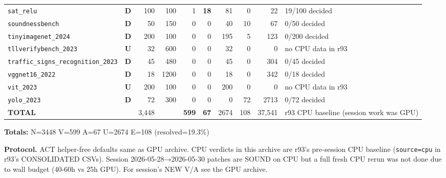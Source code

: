 \documentclass[10pt]{beamer}
\newcommand{\sdone}{{\color{cdone}\textbf{D}}}
\newcommand{\sunsup}{{\color{cunsup}\textbf{U}}}
\begin{document}
\begin{frame}[fragile]
\begin{tabular}{l c r r r r r r r l}
  \texttt{sat\_relu} & \sdone & 100 & 100 & 1 & \textbf{18} & 81 & 0 & 22 & 19/100 decided \\
  \texttt{soundnessbench} & \sdone & 50 & 150 & 0 & 0 & 40 & 10 & 67 & 0/50 decided \\
  \texttt{tinyimagenet\_2024} & \sdone & 200 & 100 & 0 & 0 & 195 & 5 & 123 & 0/200 decided \\
  \texttt{tllverifybench\_2023} & \sunsup & 32 & 600 & 0 & 0 & 32 & 0 & 0 & no CPU data in r93 \\
  \texttt{traffic\_signs\_recognition\_2023} & \sdone & 45 & 480 & 0 & 0 & 45 & 0 & 304 & 0/45 decided \\
  \texttt{vggnet16\_2022} & \sdone & 18 & 1200 & 0 & 0 & 18 & 0 & 342 & 0/18 decided \\
  \texttt{vit\_2023} & \sunsup & 200 & 100 & 0 & 0 & 200 & 0 & 0 & no CPU data in r93 \\
  \texttt{yolo\_2023} & \sdone & 72 & 300 & 0 & 0 & 0 & 72 & 2713 & 0/72 decided \\
\midrule
\textbf{TOTAL} & & 3,448 & & \textbf{599} & \textbf{67} & 2674 & 108 & 37,541 & r93 CPU baseline (session work was GPU) \\
\bottomrule
\end{tabular}

\vspace{0.4em}
\centering\scriptsize
\textbf{Totals:} N=3448 V=599 A=67 U=2674 E=108 (resolved=19.3\%)

\vspace{0.3em}
\centering\scriptsize
\textbf{Protocol.} ACT helper-free defaults same as GPU archive. CPU verdicts in this archive
are r93's pre-session CPU baseline (\texttt{source=cpu} in r93's CONSOLIDATED CSVs). Session
2026-05-28→2026-05-30 patches are SOUND on CPU but a full fresh CPU rerun was not done due
to wall budget (40-60h vs 25h GPU). For session's NEW V/A see the GPU archive.
\end{frame}
\end{document}
